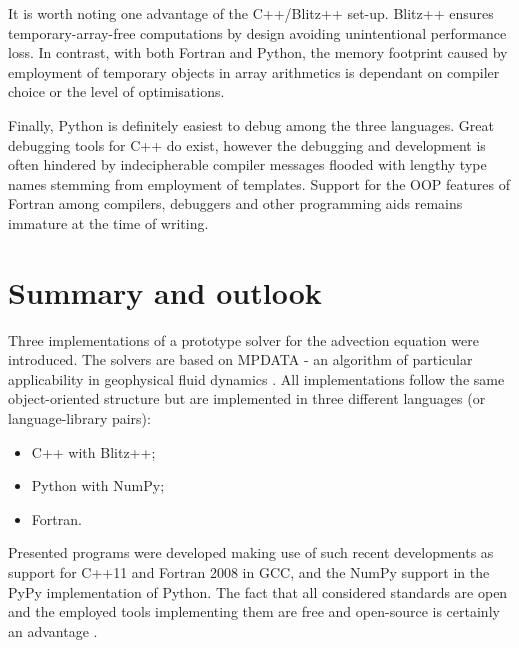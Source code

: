 \documentclass[twocolumn]{article}
\begin{document}
{  It is worth noting one advantage of the C++/Blitz++ set-up.
  Blitz++ ensures temporary-array-free computations by design
    \citep{Veldhuizen_et_al_1997} avoiding unintentional performance loss.
  In contrast, with both Fortran and Python, the memory footprint caused by employment
    of temporary objects in array arithmetics is dependant on compiler choice or
    the level of optimisations.

  Finally, Python is definitely easiest to debug among the three languages.
  Great debugging tools for C++ do exist, however the debugging and development is 
    often hindered by indecipherable compiler messages
    flooded with lengthy type names stemming from employment of templates.
  Support for the OOP features of Fortran among compilers, 
    debuggers and other programming aids remains immature at the time of writing.
  }

  \section{Summary and outlook}\label{sec:concl}

  Three implementations of a prototype solver 
    for the advection equation were introduced.
  The solvers are based on MPDATA - an algorithm of particular applicability
    in geophysical fluid dynamics \citep{Smolarkiewicz_2006}.
  All implementations follow the same object-oriented structure but are implemented
    in three different languages (or language-library pairs):
  \begin{itemize}
    \item{C++ with Blitz++;}
    \item{Python with NumPy;}
    \item{Fortran.}
  \end{itemize}

  Presented programs were developed making use of such recent
    developments as support for C++11 and Fortran 2008 in GCC, and
    the NumPy support in the PyPy implementation of Python.
  The fact that all considered standards are open and the employed
    tools implementing them are free and open-source
    is certainly an advantage \citep[][sect.~28.2.5]{Anel_2011,Syvitski_et_al_2013}.
\end{document}
